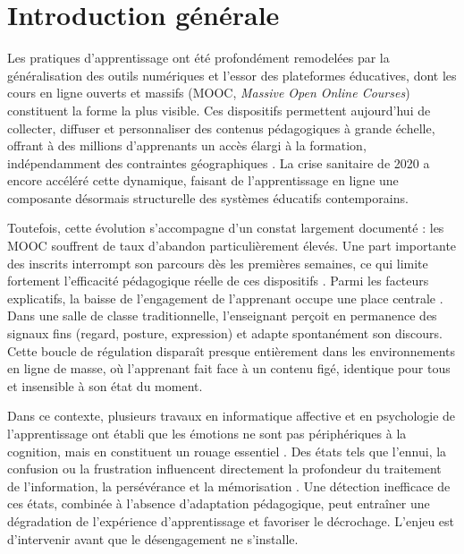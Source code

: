 \chapter*{\textbf{Introduction générale}}
\mtcaddchapter %
\label{chap:introduction}
\thispagestyle{plain}

Les pratiques d'apprentissage ont été profondément remodelées par la
généralisation des outils numériques et l'essor des plateformes éducatives,
dont les cours en ligne ouverts et massifs (MOOC, \emph{Massive Open Online
Courses}) constituent la forme la plus visible. Ces dispositifs
permettent aujourd'hui de collecter, diffuser et personnaliser des contenus
pédagogiques à grande échelle, offrant à des millions d'apprenants un accès
élargi à la formation, indépendamment des contraintes géographiques
\cite{breslow2013studying,daniel2012making}. La crise sanitaire de 2020 a
encore accéléré cette dynamique, faisant de l'apprentissage en ligne une
composante désormais structurelle des systèmes éducatifs contemporains.

Toutefois, cette évolution s'accompagne d'un constat largement documenté :
les MOOC souffrent de taux d'abandon particulièrement élevés. Une part
importante des inscrits interrompt son parcours dès les premières semaines,
ce qui limite fortement l'efficacité pédagogique réelle de ces dispositifs
\cite{onah2014dropout,jordan2015massive}. Parmi les facteurs explicatifs,
la baisse de l'engagement de l'apprenant occupe une place centrale
\cite{kizilcec2013deconstructing,hew2016promoting}. Dans une salle de classe
traditionnelle, l'enseignant perçoit en permanence des signaux fins (regard,
posture, expression) et adapte spontanément son discours. Cette boucle de
régulation disparaît presque entièrement dans les environnements en ligne de
masse, où l'apprenant fait face à un contenu figé, identique pour tous et
insensible à son état du moment.

Dans ce contexte, plusieurs travaux en informatique affective et en
psychologie de l'apprentissage ont établi que les émotions ne sont pas
périphériques à la cognition, mais en constituent un rouage essentiel
\cite{picard1997affective,pekrun2006control}. Des états tels que l'ennui, la
confusion ou la frustration influencent directement la profondeur du traitement
de l'information, la persévérance et la mémorisation
\cite{dmello2012dynamics,baker2010better}. Une détection inefficace de ces
états, combinée à l'absence d'adaptation pédagogique, peut entraîner une
dégradation de l'expérience d'apprentissage et favoriser le décrochage.
L'enjeu est d'intervenir avant que le désengagement ne s'installe.

